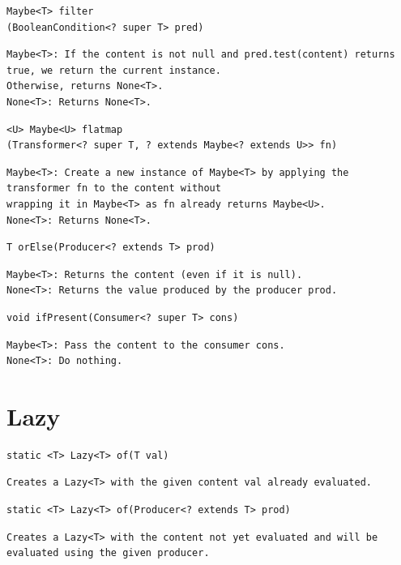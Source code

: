 \documentclass[5pt, portrait]{article}
\begin{document}
\begin{verbatim}
Maybe<T> filter
(BooleanCondition<? super T> pred)
\end{verbatim}
\begin{verbatim}
Maybe<T>: If the content is not null and pred.test(content) returns true, we return the current instance.
Otherwise, returns None<T>.
None<T>: Returns None<T>.
\end{verbatim}

\begin{verbatim}
<U> Maybe<U> flatmap
(Transformer<? super T, ? extends Maybe<? extends U>> fn)
\end{verbatim}
\begin{verbatim}
Maybe<T>: Create a new instance of Maybe<T> by applying the transformer fn to the content without
wrapping it in Maybe<T> as fn already returns Maybe<U>.
None<T>: Returns None<T>.
\end{verbatim}

\begin{verbatim}
T orElse(Producer<? extends T> prod)
\end{verbatim}
\begin{verbatim}
Maybe<T>: Returns the content (even if it is null).
None<T>: Returns the value produced by the producer prod.
\end{verbatim}

\begin{verbatim}
void ifPresent(Consumer<? super T> cons)
\end{verbatim}
\begin{verbatim}
Maybe<T>: Pass the content to the consumer cons.
None<T>: Do nothing.
\end{verbatim}

\section{Lazy}
\begin{verbatim}
static <T> Lazy<T> of(T val)
\end{verbatim}
\begin{verbatim}
Creates a Lazy<T> with the given content val already evaluated.
\end{verbatim}

\begin{verbatim}
static <T> Lazy<T> of(Producer<? extends T> prod)
\end{verbatim}
\begin{verbatim}
Creates a Lazy<T> with the content not yet evaluated and will be evaluated using the given producer.
\end{verbatim}
\end{document}
